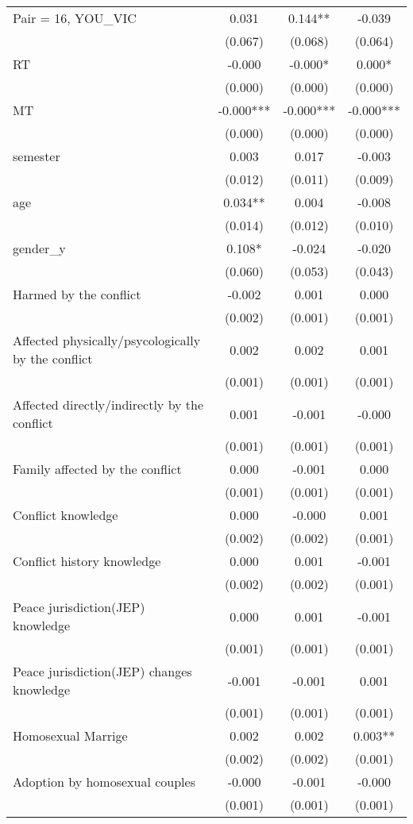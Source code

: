 \documentclass[]{article}
\begin{document}
\begin{tabular}{lccc}
Pair = 16, YOU\_VIC & 0.031 & 0.144** & -0.039 \\
 & (0.067) & (0.068) & (0.064) \\
RT & -0.000 & -0.000* & 0.000* \\
 & (0.000) & (0.000) & (0.000) \\
MT & -0.000*** & -0.000*** & -0.000*** \\
 & (0.000) & (0.000) & (0.000) \\
semester & 0.003 & 0.017 & -0.003 \\
 & (0.012) & (0.011) & (0.009) \\
age & 0.034** & 0.004 & -0.008 \\
 & (0.014) & (0.012) & (0.010) \\
gender\_y & 0.108* & -0.024 & -0.020 \\
 & (0.060) & (0.053) & (0.043) \\
Harmed by the conflict & -0.002 & 0.001 & 0.000 \\
 & (0.002) & (0.001) & (0.001) \\
Affected physically/psycologically by the conflict & 0.002 & 0.002 & 0.001 \\
 & (0.001) & (0.001) & (0.001) \\
Affected directly/indirectly by the conflict & 0.001 & -0.001 & -0.000 \\
 & (0.001) & (0.001) & (0.001) \\
Family affected by the conflict & 0.000 & -0.001 & 0.000 \\
 & (0.001) & (0.001) & (0.001) \\
Conflict knowledge & 0.000 & -0.000 & 0.001 \\
 & (0.002) & (0.002) & (0.001) \\
Conflict history knowledge & 0.000 & 0.001 & -0.001 \\
 & (0.002) & (0.002) & (0.001) \\
Peace jurisdiction(JEP) knowledge & 0.000 & 0.001 & -0.001 \\
 & (0.001) & (0.001) & (0.001) \\
Peace jurisdiction(JEP) changes knowledge & -0.001 & -0.001 & 0.001 \\
 & (0.001) & (0.001) & (0.001) \\
Homosexual Marrige & 0.002 & 0.002 & 0.003** \\
 & (0.002) & (0.002) & (0.001) \\
Adoption by homosexual couples & -0.000 & -0.001 & -0.000 \\
 & (0.001) & (0.001) & (0.001) \\

\end{tabular}
\end{document}
